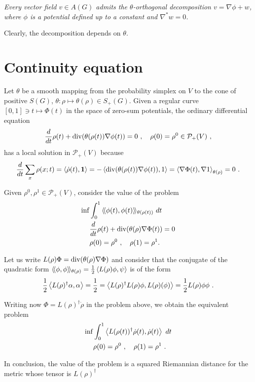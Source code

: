 \documentclass[12pt,a4paper]{amsart}
\theoremstyle{definition}
\begin{document}
\emph{Every vector field $v \in A(G)$ admits the $\theta$-orthogonal
  decomposition $v = \nabla \phi + w$, where $\phi$ is a potential
  defined up to a constant and $\nabla^* w = 0$.}

Clearly, the decomposition depends on $\theta$.

\section{Continuity equation}
\label{sec:continuity}

Let $\theta$ be a smooth mapping from the probability simplex on $V$ to the
cone of positive $S(G)$, $\theta \colon \rho \mapsto \theta(\rho) \in
S_+(G)$. Given a regular curve $[0,1] \ni t \mapsto \Phi(t)$ in the
space of zero-sum potentials, the ordinary differential equation
\begin{equation*}
  \derivby t \rho(t) +  \Div(\theta(\rho(t))\nabla \phi(t)) = 0 \ , \quad
  \rho(0) = \rho^0 \in \mathcal P_+(V) \ ,
\end{equation*}
has a local solution in $\mathcal P_+(V)$ because
\begin{equation*}
  \derivby t \sum_x \rho(x;t) = \scalarof {\dot \rho(t)}{\one} = 
 - \scalarof {\Div(\theta(\rho(t))\nabla \phi(t))}{1} = \scalarat
 {\theta(\rho)} {\nabla \Phi(t)}{\nabla 1}
 = 0 \ .
\end{equation*}

Given $\rho^0, \rho^1 \in \mathcal P_+(V)$, consider the value of the problem
\begin{align*}
 \inf &\int_0^1 \Scalarat {\theta(\rho(t))} {\phi(t)}{\phi(t)} \ dt
 \\
 &\derivby t \rho(t) +  \Div(\theta(\rho)\nabla \Phi(t)) = 0 \\
 &\rho(0) = \rho^0 \ , \quad \rho(1) = \rho^1.
\end{align*}

Let us write $L(\rho)\Phi = \Div(\theta(\rho)\nabla \Phi)$ and
consider that the conjugate of the quadratic form
$\Scalarat {\theta(\rho)} \phi \phi = \frac 12 \scalarof {L(\rho)\phi}
\psi$ is of the form
\begin{equation*}
  \frac 12 \scalarof {L(\rho)^\dagger \alpha} {\alpha} = \frac12 =
  \scalarof {L(\rho)^\dagger L(\rho) \phi} {L(\rho)(\phi)} = \frac12
  {L(\rho) \phi} \phi \ . 
\end{equation*}

Writing now $\Phi = L(\rho)^\dagger \dot \rho$ in the problem above,
we obtain the equivalent problem
\begin{align*}
 \inf &\int_0^1 \scalarof {L(\rho(t))^\dagger \dot \rho(t)}{\dot \rho(t)} \ dt
 \\
 &\rho(0) = \rho^0 \ , \quad \rho(1) = \rho^1 \ .
\end{align*}

In conclusion, the value of the problem is a squared Riemannian
distance for the metric whose tensor is $L(\rho)^\dagger$



\end{document}
